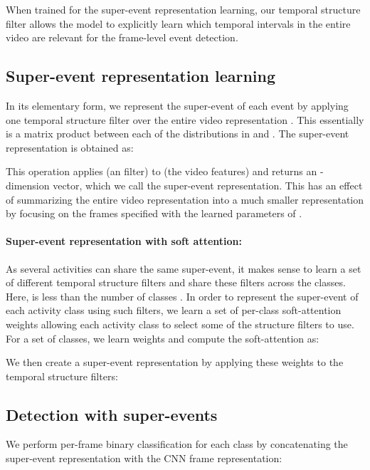 \documentclass[10pt,twocolumn,letterpaper]{article}
\begin{document}
When trained for the super-event representation learning, our temporal structure filter allows the model to explicitly learn which temporal intervals in the entire video are relevant for the frame-level event detection.

\subsection{Super-event representation learning}
\label{subsec:super}


In its elementary form, we represent the super-event of each event  by applying one temporal structure filter  over the entire video representation . This essentially is a matrix product between each of the  distributions in  and . The super-event representation  is obtained as:

This operation applies  (an  filter) to  (the  video features) and returns an -dimension vector, which we call the super-event representation. This has an effect of summarizing the entire video representation  into a much smaller representation  by focusing on the frames specified with the learned parameters of .



\vspace{-3pt}
\paragraph{Super-event representation with soft attention:}

As several activities can share the same super-event, it makes sense to learn a set of  different temporal structure filters and share these filters across the classes. Here,  is less than the number of classes . In order to represent the super-event of each activity class  using such  filters, we learn a set of per-class soft-attention weights allowing each activity class to select some of the  structure filters to use. For a set of  classes, we learn weights  and compute the soft-attention as:

We then create a super-event representation by applying these weights to the  temporal structure filters:





\subsection{Detection with super-events}
We perform per-frame binary classification for each class by concatenating the super-event representation with the CNN frame representation:
\end{document}
